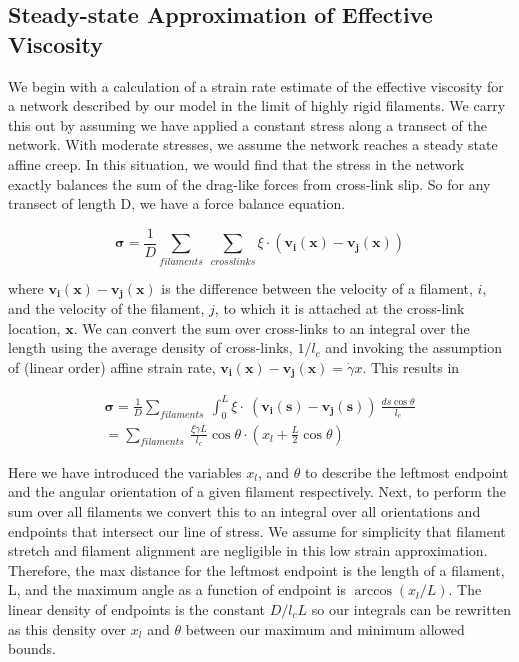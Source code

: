 \documentclass[10pt,letterpaper]{article}
\date{}
\begin{document}
\subsection{Steady-state Approximation of Effective Viscosity}
\label{sec:eff_vic}
We begin with a calculation of a strain rate estimate of the effective viscosity for a network described by our model in the limit of highly rigid filaments.  We carry this out by assuming we have applied a constant stress along a transect of the network.  With moderate stresses, we assume the network reaches a steady state affine creep. In this situation, we would find that the stress in the network exactly balances the sum of the drag-like forces from cross-link slip.  So for any transect of length D, we have a force balance equation.

\begin{equation}
\mathbf{\sigma} = \frac{1}{D}\sum_{filaments}\: \sum_{crosslinks}\xi \cdot (\mathbf{v_i(x)}-\mathbf{v_j(x)})
\end{equation}

where $\mathbf{v_i(x)}-\mathbf{v_j(x)}$ is the difference between the velocity of a filament, $i$, and the velocity of the filament, $j$, to which it is attached at the cross-link location, $\mathbf{x}$. We can convert the sum over cross-links to an integral over the length using the average density of cross-links, $1/l_c$ and invoking the assumption of (linear order) affine strain rate, $\mathbf{v_i(x)}-\mathbf{v_j(x)}=\dot \gamma x$. This results in

\begin{multline}
\mathbf{\sigma} =  \frac{1}{D}\sum_{filaments}\:  \int_0^L \xi \cdot  \: (\mathbf{v_i(s)}-\mathbf{v_j(s)}) \:\frac{ds \cos \theta }{l_c} \\
 = \sum_{filaments}\:  \frac{\xi \dot \gamma L}{l_c} \cos \theta \cdot (x_l + \frac{L}{2} \cos \theta)
\end{multline}

Here we have introduced the variables $x_l$, and $\theta$ to describe the leftmost endpoint and the angular orientation of a given filament respectively.  Next, to perform the sum over all filaments we convert this to an integral over all orientations and endpoints that intersect our line of stress. We assume for simplicity that filament stretch and filament alignment are negligible in this low strain approximation.  Therefore, the max distance for the leftmost endpoint is the length of a filament, L, and the maximum angle as a function of endpoint is $\arccos(x_l/L)$.  The linear density of endpoints is the constant $D/l_cL$ so our integrals can be rewritten as this density over $x_l$ and $\theta$ between our maximum and minimum allowed bounds.
\end{document}
